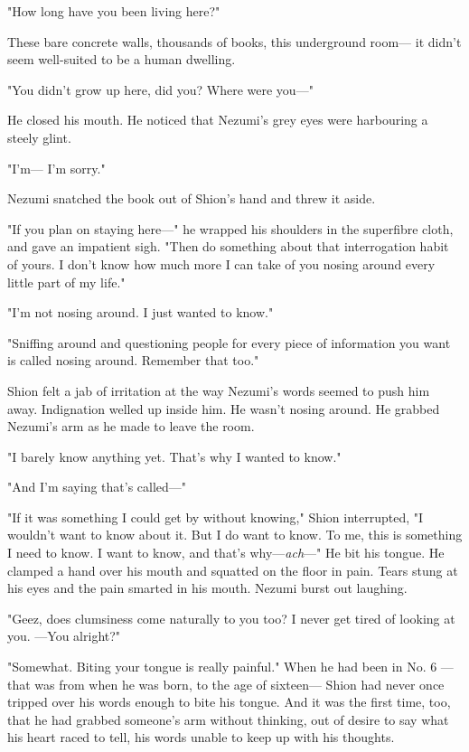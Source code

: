 "How long have you been living here?"

These bare concrete walls, thousands of books, this underground room--- it
didn't seem well-suited to be a human dwelling.

"You didn't grow up here, did you? Where were you---"

He closed his mouth. He noticed that Nezumi's grey eyes were harbouring
a steely glint.

"I'm--- I'm sorry."

Nezumi snatched the book out of Shion's hand and threw it aside.

"If you plan on staying here---" he wrapped his shoulders in the
superfibre cloth, and gave an impatient sigh. "Then do something about
that interrogation habit of yours. I don't know how much more I can take
of you nosing around every little part of my life."

"I'm not nosing around. I just wanted to know."

"Sniffing around and questioning people for every piece of information
you want is called nosing around. Remember that too."

Shion felt a jab of irritation at the way Nezumi's words seemed to push
him away. Indignation welled up inside him. He wasn't nosing around. He
grabbed Nezumi's arm as he made to leave the room.

"I barely know anything yet. That's why I wanted to know."

"And I'm saying that's called---"

"If it was something I could get by without knowing," Shion interrupted,
"I wouldn't want to know about it. But I do want to know. To me, this is
something I need to know. I want to know, and that's why---\emph{ach}---" He bit
his tongue. He clamped a hand over his mouth and squatted on the floor
in pain. Tears stung at his eyes and the pain smarted in his mouth.
Nezumi burst out laughing.

"Geez, does clumsiness come naturally to you too? I never get tired of
looking at you. ---You alright?"

"Somewhat. Biting your tongue is really painful." When he had been in
No. 6 --- that was from when he was born, to the age of sixteen--- Shion had
never once tripped over his words enough to bite his tongue. And it was
the first time, too, that he had grabbed someone's arm without thinking,
out of desire to say what his heart raced to tell, his words unable to
keep up with his thoughts.

